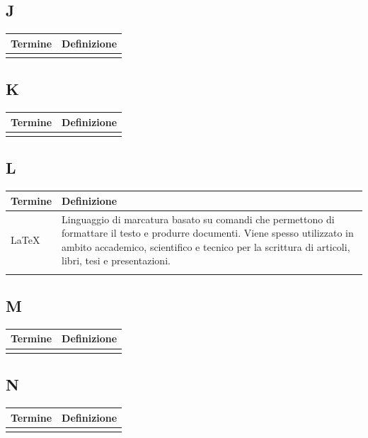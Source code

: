 \documentclass[10pt]{article}
\begin{document}
\subsection{J} %
\begin{tabularx}{\textwidth}{|>{\centering\arraybackslash}l|X|}
\hline
\rowcolor[gray]{0.8}
\textbf{Termine} & \textbf{Definizione}\\
\hline
 & \\
\hline
\end{tabularx}

\subsection{K} %
\begin{tabularx}{\textwidth}{|>{\centering\arraybackslash}l|X|}
\hline
\rowcolor[gray]{0.8}
\textbf{Termine} & \textbf{Definizione}\\
\hline
 & \\
\hline
\end{tabularx}

\subsection{L} %
\begin{tabularx}{\textwidth}{|>{\centering\arraybackslash}l|X|}
\hline
\rowcolor[gray]{0.8}
\textbf{Termine} & \textbf{Definizione}\\
\hline
LaTeX & Linguaggio di marcatura basato su comandi che permettono di formattare il testo e produrre documenti. Viene spesso utilizzato in ambito accademico, scientifico e tecnico per la scrittura di articoli, libri, tesi e presentazioni.\\
\hline
 & \\
\hline
\end{tabularx}
 
\subsection{M} %
\begin{tabularx}{\textwidth}{|>{\centering\arraybackslash}l|X|}
\hline
\rowcolor[gray]{0.8}
\textbf{Termine} & \textbf{Definizione}\\
\hline
 & \\
\hline
\end{tabularx}

\subsection{N} %
\begin{tabularx}{\textwidth}{|>{\centering\arraybackslash}l|X|}
\hline
\rowcolor[gray]{0.8}
\textbf{Termine} & \textbf{Definizione}\\
\hline
 & \\
\hline
\end{tabularx}
\end{document}
